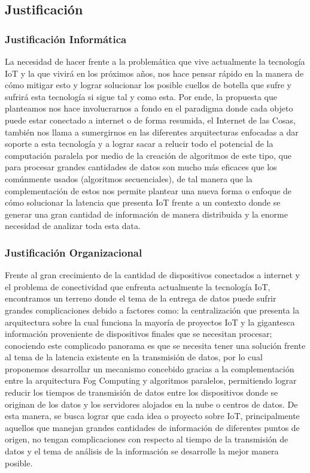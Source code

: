     \subsection{Justificación}
        \subsubsection{Justificación Informática}
            La necesidad de hacer frente a la problemática que vive actualmente la tecnología IoT y la que vivirá en los próximos años, nos hace pensar rápido en la manera de cómo mitigar esto y lograr solucionar los posible cuellos de botella que sufre y sufrirá esta tecnología si sigue tal y como esta. Por ende, la propuesta que planteamos nos hace involucrarnos a fondo en el paradigma donde cada objeto puede estar conectado a internet o de forma resumida, el Internet de las Cosas, también nos llama a sumergirnos en las diferentes arquitecturas enfocadas a dar soporte a esta tecnología y a lograr sacar a relucir todo el potencial de la computación paralela por medio de la creación de algoritmos de este tipo, que para procesar grandes cantidades de datos son mucho más eficaces que los comúnmente usados (algoritmos secuenciales), de tal manera que la complementación de estos nos permite plantear una nueva forma o enfoque de cómo solucionar la latencia que presenta IoT frente a un contexto donde se generar una gran cantidad de información de manera distribuida y la enorme necesidad de analizar toda esta data.
        \subsubsection{Justificación Organizacional}
            Frente al gran crecimiento de la cantidad de dispositivos conectados a internet y el problema de conectividad que enfrenta actualmente la tecnología IoT, encontramos un terreno donde el tema de la entrega de datos puede sufrir grandes complicaciones debido a factores como: la centralización que presenta la arquitectura sobre la cual funciona la mayoría de proyectos IoT y la gigantesca información proveniente de dispositivos finales que se necesitan procesar; conociendo este complicado panorama es que se necesita tener una solución frente al tema de la latencia existente en la transmisión de datos, por lo cual proponemos desarrollar un mecanismo concebido gracias a la complementación entre la arquitectura Fog Computing y algoritmos paralelos, permitiendo lograr reducir los tiempos de transmisión de datos entre los dispositivos donde se originan de los datos y los servidores alojados en la nube o centros de datos. De esta manera, se busca lograr que cada idea o proyecto sobre IoT, principalmente aquellos que manejan grandes cantidades de información de diferentes puntos de origen, no tengan complicaciones con respecto al tiempo de la transmisión de datos y el tema de análisis de la información se desarrolle la mejor manera posible.
